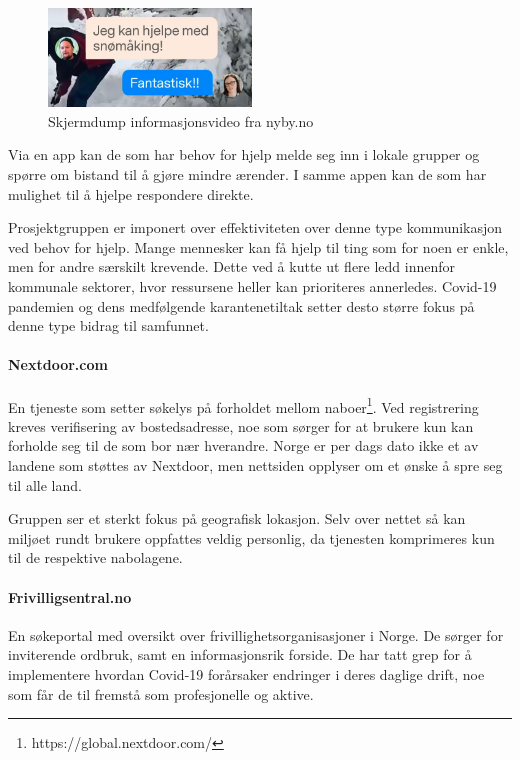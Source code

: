 \begin{figure}
  \begin{center}
    \includegraphics[width=0.48\textwidth]{Illustrasjoner/andre_platformer/nyby_svar.png}
  \end{center}
  \caption{Skjermdump informasjonsvideo fra nyby.no}
  \label{fig:nyby2}
\end{figure}
Via en app kan de som har behov for hjelp melde seg inn i lokale grupper og spørre om bistand til å gjøre mindre ærender. I samme appen kan de som har mulighet til å hjelpe respondere direkte.

Prosjektgruppen er imponert over effektiviteten over denne type kommunikasjon ved behov for hjelp. Mange mennesker kan få hjelp til ting som for noen er enkle, men for andre særskilt krevende. Dette ved å kutte ut flere ledd innenfor kommunale sektorer, hvor ressursene heller kan prioriteres annerledes. Covid-19 pandemien og dens medfølgende karantenetiltak setter desto større fokus på denne type bidrag til samfunnet.

\paragraph{Nextdoor.com} En tjeneste som setter søkelys på forholdet mellom naboer\footnote{https://global.nextdoor.com/}. Ved registrering kreves verifisering av bostedsadresse, noe som sørger for at brukere kun kan forholde seg til de som bor nær hverandre. Norge er per dags dato ikke et av landene som støttes av Nextdoor, men nettsiden opplyser om et ønske å spre seg til alle land.

Gruppen ser et sterkt fokus på geografisk lokasjon. Selv over nettet så kan miljøet rundt brukere oppfattes veldig personlig, da tjenesten komprimeres kun til de respektive nabolagene.

\paragraph{Frivilligsentral.no} En søkeportal med oversikt over frivillighetsorganisasjoner i Norge. De sørger for inviterende ordbruk, samt en informasjonsrik forside. De har tatt grep for å implementere hvordan Covid-19 forårsaker endringer i deres daglige drift, noe som får de til fremstå som profesjonelle og aktive.

